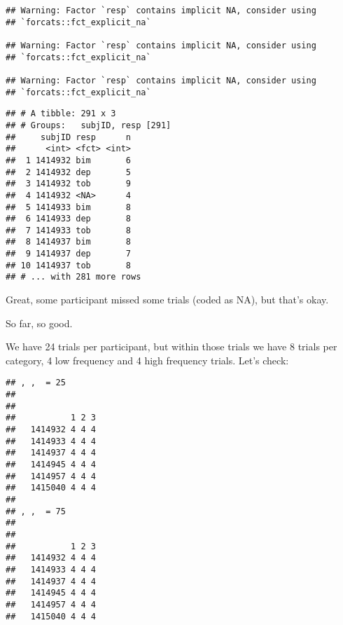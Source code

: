 \documentclass[
]{article}
\newenvironment{Shaded}{\begin{snugshade}}{\end{snugshade}}
\newcommand{\KeywordTok}[1]{\textcolor[rgb]{0.13,0.29,0.53}{\textbf{#1}}}
\newcommand{\NormalTok}[1]{#1}
\newcommand{\OperatorTok}[1]{\textcolor[rgb]{0.81,0.36,0.00}{\textbf{#1}}}
\newcommand{\StringTok}[1]{\textcolor[rgb]{0.31,0.60,0.02}{#1}}
\begin{document}
\begin{Shaded}
\end{Shaded}

\begin{verbatim}
## Warning: Factor `resp` contains implicit NA, consider using
## `forcats::fct_explicit_na`

## Warning: Factor `resp` contains implicit NA, consider using
## `forcats::fct_explicit_na`

## Warning: Factor `resp` contains implicit NA, consider using
## `forcats::fct_explicit_na`
\end{verbatim}

\begin{verbatim}
## # A tibble: 291 x 3
## # Groups:   subjID, resp [291]
##     subjID resp      n
##      <int> <fct> <int>
##  1 1414932 bim       6
##  2 1414932 dep       5
##  3 1414932 tob       9
##  4 1414932 <NA>      4
##  5 1414933 bim       8
##  6 1414933 dep       8
##  7 1414933 tob       8
##  8 1414937 bim       8
##  9 1414937 dep       7
## 10 1414937 tob       8
## # ... with 281 more rows
\end{verbatim}

Great, some participant missed some trials (coded as NA), but that's
okay.

So far, so good.

We have 24 trials per participant, but within those trials we have 8
trials per category, 4 low frequency and 4 high frequency trials. Let's
check:

\begin{Shaded}
\end{Shaded}

\begin{verbatim}
## , ,  = 25
## 
##          
##           1 2 3
##   1414932 4 4 4
##   1414933 4 4 4
##   1414937 4 4 4
##   1414945 4 4 4
##   1414957 4 4 4
##   1415040 4 4 4
## 
## , ,  = 75
## 
##          
##           1 2 3
##   1414932 4 4 4
##   1414933 4 4 4
##   1414937 4 4 4
##   1414945 4 4 4
##   1414957 4 4 4
##   1415040 4 4 4
\end{verbatim}
\end{document}
